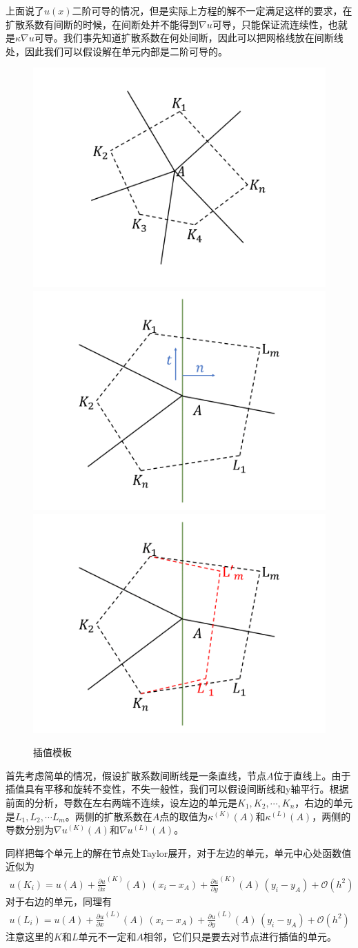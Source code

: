 \documentclass[12pt,a4paper]{article}
\theoremstyle{definition}
\begin{document}
上面说了$u(x)$二阶可导的情况，但是实际上方程的解不一定满足这样的要求，在扩散系数有间断的时候，在间断处并不能得到$\nabla u$可导，只能保证流连续性，也就是$\kappa \nabla u$可导。我们事先知道扩散系数在何处间断，因此可以把网格线放在间断线处，因此我们可以假设解在单元内部是二阶可导的。\cite{Sheng2008}

\begin{figure}[h]
\centering
\includegraphics[width=0.3\linewidth]{stencil/interp1}
\includegraphics[width=0.3\linewidth]{stencil/interp2}
\includegraphics[width=0.3\linewidth]{stencil/interp3}
\caption{插值模板}
\label{f3}
\end{figure}

首先考虑简单的情况，假设扩散系数间断线是一条直线，节点$A$位于直线上。由于插值具有平移和旋转不变性，不失一般性，我们可以假设间断线和y轴平行。根据前面的分析，导数在左右两端不连续，设左边的单元是$K_1, K_2, \cdots, K_n$，右边的单元是$L_1, L_2, \cdots L_m$。两侧的扩散系数在$A$点的取值为$\kappa^{(K)}(A)$和$\kappa^{(L)}(A)$，两侧的导数分别为$\nabla u^{(K)}(A)$和$\nabla u^{(L)}(A)$。

同样把每个单元上的解在节点处Taylor展开，对于左边的单元，单元中心处函数值近似为
\begin{align*}
u(K_i) = u(A) + \frac{\partial u}{\partial x}^{(K)}(A) \, (x_i - x_A) + \frac{\partial u}{\partial y}^{(K)}(A) \, (y_i - y_A) + \mathcal{O}(h^2)
\end{align*}
对于右边的单元，同理有
\begin{align*}
u(L_i) = u(A) + \frac{\partial u}{\partial x}^{(L)}(A) \, (x_i - x_A) + \frac{\partial u}{\partial y}^{(L)}(A) \, (y_i - y_A) + \mathcal{O}(h^2)
\end{align*}
注意这里的$K$和$L$单元不一定和$A$相邻，它们只是要去对节点进行插值的单元。
\end{document}
